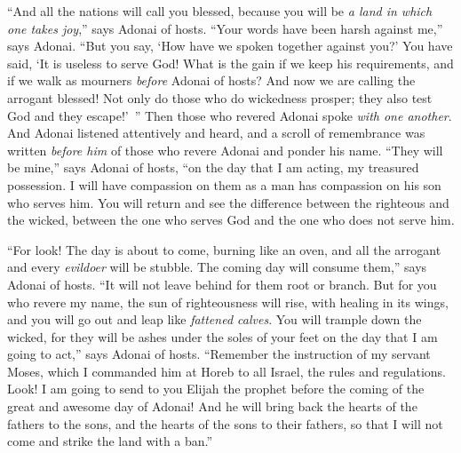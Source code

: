 \begin{biblechapter}
\verse “And all the nations will call you blessed, because you will be \textit{a land in which one takes joy},” says Adonai of hosts.
\verse “Your words have been harsh against me,” says Adonai. “But you say, ‘How have we spoken together against you?’
\verse You have said, ‘It is useless to serve God! What is the gain if we keep his requirements, and if we walk as mourners \textit{before} Adonai of hosts?
\verse And now we are calling the arrogant blessed! Not only do those who do wickedness prosper; they also test God and they escape!’ ”
 Then those who revered Adonai spoke \textit{with one another}. And Adonai listened attentively and heard, and a scroll of remembrance was written \textit{before him} of those who revere Adonai and ponder his name.
\verse “They will be mine,” says Adonai of hosts, “on the day that I am acting, my treasured possession. I will have compassion on them as a man has compassion on his son who serves him.
\verse You will return and see the difference between the righteous and the wicked, between the one who serves God and the one who does not serve him.
\end{biblechapter}

\begin{biblechapter} %
\verse {} “For look! The day is about to come, burning like an oven, and all the arrogant and every \textit{evildoer} will be stubble. The coming day will consume them,” says Adonai of hosts. “It will not leave behind for them root or branch.
\verse But for you who revere my name, the sun of righteousness will rise, with healing in its wings, and you will go out and leap like \textit{fattened calves}.
\verse You will trample down the wicked, for they will be ashes under the soles of your feet on the day that I am going to act,” says Adonai of hosts.
\verse “Remember the instruction of my servant Moses, which I commanded him at Horeb to all Israel, the rules and regulations.
\verse Look! I am going to send to you Elijah the prophet before the coming of the great and awesome day of Adonai!
\verse And he will bring back the hearts of the fathers to the sons, and the hearts of the sons to their fathers, so that I will not come and strike the land with a ban.”
\end{biblechapter}

